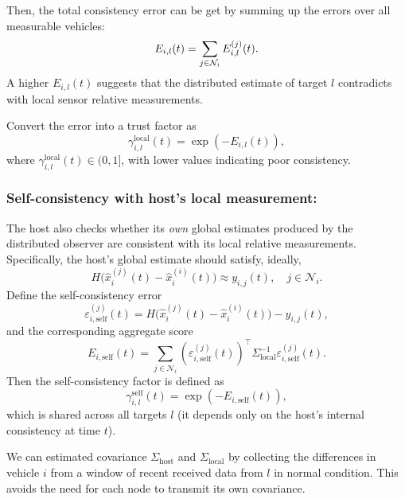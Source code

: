 Then, the total consistency error can be get by summing up the errors over all measurable vehicles:
\begin{equation} 
    E_{i,l}(t) = \sum_{j \in \mathcal{N}_i} E_{i,l}^{(j)}(t).
\end{equation}
A higher $E_{i,l}(t)$  suggests that the distributed estimate of target $l$ contradicts with local sensor relative measurements.

Convert the error into a trust factor as
\begin{equation}
    \gamma_{i,l}^{\text{local}}(t) = \exp\left( -{E_{i,l}(t)} \right),
\end{equation}
where $\gamma_{i,l}^{\text{local}}(t) \in (0, 1]$, with lower values indicating poor consistency. 

\subsubsection{Self-consistency with host's local measurement:}
The host also checks whether its \emph{own} global estimates produced by the distributed observer are consistent with its local relative measurements. Specifically, the host's global estimate should satisfy, ideally,
\begin{equation*}
    H\big(\hat{x}_i^{(j)}(t) - \hat{x}_i^{(i)}(t)\big) \approx y_{i,j}(t),\quad j\in\mathcal{N}_i.
\end{equation*}
Define the self-consistency error
\begin{equation}
    \varepsilon_{i,\text{self}}^{(j)}(t) = H\big(\hat{x}_i^{(j)}(t) - \hat{x}_i^{(i)}(t)\big) - y_{i,j}(t),
\end{equation}
and the corresponding aggregate score
\begin{equation}
    E_{i,\text{self}}(t) = \sum_{j\in\mathcal{N}_i} (\varepsilon_{i,\text{self}}^{(j)}(t))^{\top}\Sigma_{\text{local}}^{-1}\varepsilon_{i,\text{self}}^{(j)}(t).
\end{equation}
Then the self-consistency factor is defined as
\begin{equation}
    \gamma_{i,l}^{\text{self}}(t) = \exp\left(-E_{i,\text{self}}(t)\right),
\end{equation}
which is shared across all targets $l$ (it depends only on the host's internal consistency at time $t$).
\begin{remark}
We can estimated covariance $\Sigma_{\text{host}}$ and $\Sigma_{\text{local}}$ by collecting the differences in vehicle \(i\) from a window of recent received data from \(l\) in normal condition.
This avoids the need for each node to transmit its own covariance.
\end{remark}
\vspace*{-0.3cm}
